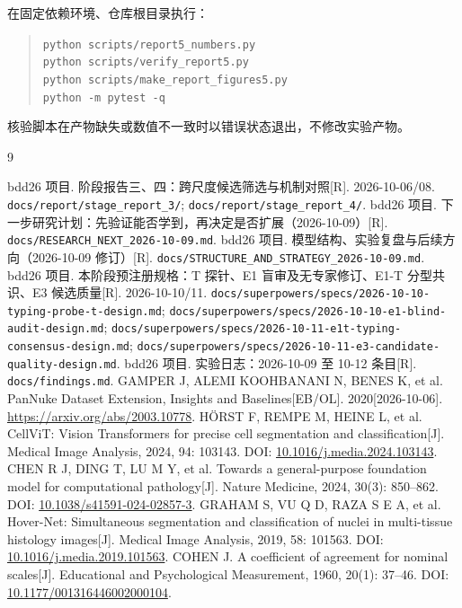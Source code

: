 \documentclass[11pt,a4paper,UTF8,fontset=fandol]{ctexart}
\newcommand{\code}[1]{\nolinkurl{#1}}
\begin{document}
在固定依赖环境、仓库根目录执行：
\begin{quote}\small
\texttt{python scripts/report5\_numbers.py}\\
\texttt{python scripts/verify\_report5.py}\\
\texttt{python scripts/make\_report\_figures5.py}\\
\texttt{python -m pytest -q}
\end{quote}
核验脚本在产物缺失或数值不一致时以错误状态退出，不修改实验产物。

\begin{thebibliography}{9}
\raggedright
{} bdd26 项目. 阶段报告三、四：跨尺度候选筛选与机制对照[R]. 2026-10-06/08. \code{docs/report/stage_report\_3/}; \code{docs/report/stage_report\_4/}.
 bdd26 项目. 下一步研究计划：先验证能否学到，再决定是否扩展（2026-10-09）[R]. \code{docs/RESEARCH\_NEXT\_2026-10-09.md}.
 bdd26 项目. 模型结构、实验复盘与后续方向（2026-10-09 修订）[R]. \code{docs/STRUCTURE\_AND\_STRATEGY\_2026-10-09.md}.
 bdd26 项目. 本阶段预注册规格：T 探针、E1 盲审及无专家修订、E1-T 分型共识、E3 候选质量[R]. 2026-10-10/11. \code{docs/superpowers/specs/2026-10-10-typing-probe-t-design.md}; \code{docs/superpowers/specs/2026-10-10-e1-blind-audit-design.md}; \code{docs/superpowers/specs/2026-10-11-e1t-typing-consensus-design.md}; \code{docs/superpowers/specs/2026-10-11-e3-candidate-quality-design.md}.
 bdd26 项目. 实验日志：2026-10-09 至 10-12 条目[R]. \code{docs/findings.md}.
 GAMPER J, ALEMI KOOHBANANI N, BENES K, et al. PanNuke Dataset Extension, Insights and Baselines[EB/OL]. 2020[2026-10-06]. \url{https://arxiv.org/abs/2003.10778}.
 H\"ORST F, REMPE M, HEINE L, et al. CellViT: Vision Transformers for precise cell segmentation and classification[J]. Medical Image Analysis, 2024, 94: 103143. DOI: \href{https://doi.org/10.1016/j.media.2024.103143}{10.1016/j.media.2024.103143}.
 CHEN R J, DING T, LU M Y, et al. Towards a general-purpose foundation model for computational pathology[J]. Nature Medicine, 2024, 30(3): 850--862. DOI: \href{https://doi.org/10.1038/s41591-024-02857-3}{10.1038/s41591-024-02857-3}.
 GRAHAM S, VU Q D, RAZA S E A, et al. Hover-Net: Simultaneous segmentation and classification of nuclei in multi-tissue histology images[J]. Medical Image Analysis, 2019, 58: 101563. DOI: \href{https://doi.org/10.1016/j.media.2019.101563}{10.1016/j.media.2019.101563}.
 COHEN J. A coefficient of agreement for nominal scales[J]. Educational and Psychological Measurement, 1960, 20(1): 37--46. DOI: \href{https://doi.org/10.1177/001316446002000104}{10.1177/001316446002000104}.
\end{thebibliography}
\end{document}
